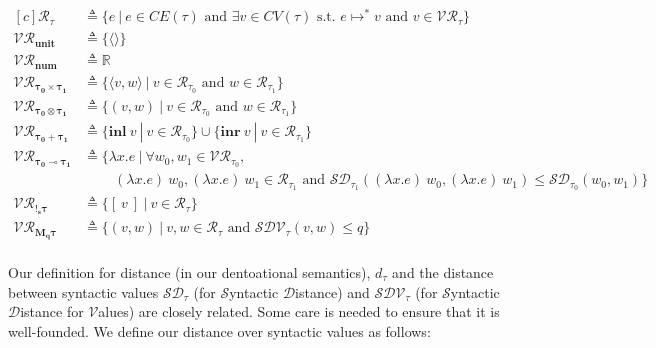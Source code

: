 \begin{definition}
  \begin{equation}
  \begin{aligned}[c]
    \mathcal{R_{\tau}} &\triangleq 
      \{ e \ | \ e \in CE(\tau) \text{ and } \exists v
        \in CV(\tau) \text{ s.t. } e \mapsto^{*} v \text{ and } v \in \mathcal{VR_{\tau}} 
      \} \\
    \mathcal{VR_{\mathbf{unit}}} &\triangleq \{ \langle \rangle \} \\
    \mathcal{VR_{\mathbf{num}}} &\triangleq \mathbb{R} \\
    \mathcal{VR_{\mathbf{\tau_0 \times \tau_1}}} &\triangleq 
      \{ \langle v, w \rangle \ | 
        \ v \in \mathcal{R}_{\tau_0} \text{ and } w \in \mathcal{R}_{\tau_1}
      \} \\
    \mathcal{VR_{\mathbf{\tau_0 \otimes \tau_1}}} &\triangleq 
      \{ ( v, w ) \ | 
        \ v \in \mathcal{R}_{\tau_0} \text{ and } w \in \mathcal{R}_{\tau_1}
      \} \\
    \mathcal{VR_{\mathbf{\tau_0 + \tau_1}}} &\triangleq 
      \{ \mathbf{inl}~v \ | \ v \in \mathcal{R}_{\tau_0} \} 
      \cup
      \{ \mathbf{inr}~v \ | \ v \in \mathcal{R}_{\tau_1} \} \\
    \mathcal{VR_{\mathbf{\tau_0 \multimap \tau_1}}} &\triangleq 
      \{ \lambda x . e \ | \ \forall w_0, w_1 \in \mathcal{VR}_{\tau_0}, \\ & \quad \quad \ (\lambda x.e)~w_0, (\lambda x . e)~w_1 \in
      \mathcal{R}_{\tau_1} \text{ and } \mathcal{SD}_{\tau_1}((\lambda x . e)~w_0, (\lambda x . e)~w_1) \leq
      \mathcal{SD}_{\tau_0}(w_0, w_1) \} \\
    \mathcal{VR_{\mathbf{!_s \tau}}} &\triangleq 
      \{ [~v~] \ | \ v \in \mathcal{R}_{\tau} \} \\
    \mathcal{VR_{\mathbf{M_q \tau}}} &\triangleq 
      \{ (v, w) \ | \ v, w \in \mathcal{R}_{\tau} \text{ and } \mathcal{SDV}_{\tau}(v, w)
      \leq q \} \\
  \end{aligned}
  \end{equation}
\end{definition}

Our definition for distance (in our dentoational semantics), $d_\tau$ and the
distance between syntactic values $\mathcal{SD}_\tau$ (for $\mathcal{S}$yntactic
$\mathcal{D}$istance) and $\mathcal{SDV}_\tau$ (for $\mathcal{S}$yntactic
$\mathcal{D}$istance for $\mathcal{V}$alues) are closely related. Some care is
needed to ensure that it is well-founded. We define our distance over syntactic
values as follows:

